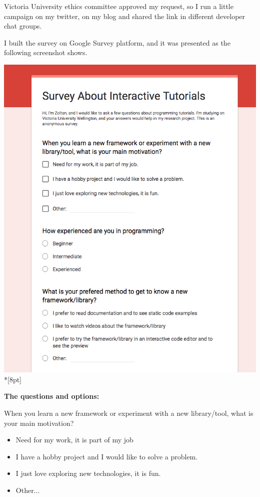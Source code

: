 \documentclass[12pt, a4paper, oneside, openright, medskipamount]{report}
\begin{document}
Victoria University ethics committee approved my request, so I run a little campaign on my twitter, on my blog and shared the link in different developer chat groups.

I built the survey on Google Survey platform, and it was presented as the following screenshot shows.

\includegraphics[width=1\textwidth]{assets/survey-screenshot.png}\\*[8pt]

\textbf{The questions and options:}

\noindent When you learn a new framework or experiment with a new library/tool, what is your main motivation?
\begin{itemize}[noitemsep]
\item Need for my work, it is part of my job
\item I have a hobby project and I would like to solve a problem.
\item I just love exploring new technologies, it is fun.
\item Other...
\end{itemize}
\end{document}
